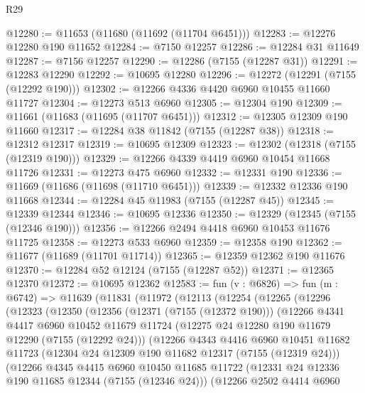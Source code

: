 \begin{lexlean}{R29}
\begin{coremodule}
@12280 := @11653 (@11680 (@11692 (@11704 @6451)))
@12283 := @12276 @12280 @190 @11652
@12284 := @7150 @12257
@12286 := @12284 @31 @11649
@12287 := @7156 @12257
@12290 := @12286 (@7155 (@12287 @31))
@12291 := @12283 @12290
@12292 := @10695 @12280
@12296 := @12272 (@12291 (@7155 (@12292 @190)))
@12302 := @12266 @4336 @4420 @6960 @10455 @11660 @11727
@12304 := @12273 @513 @6960
@12305 := @12304 @190
@12309 := @11661 (@11683 (@11695 (@11707 @6451)))
@12312 := @12305 @12309 @190 @11660
@12317 := @12284 @38 @11842 (@7155 (@12287 @38))
@12318 := @12312 @12317
@12319 := @10695 @12309
@12323 := @12302 (@12318 (@7155 (@12319 @190)))
@12329 := @12266 @4339 @4419 @6960 @10454 @11668 @11726
@12331 := @12273 @475 @6960
@12332 := @12331 @190
@12336 := @11669 (@11686 (@11698 (@11710 @6451)))
@12339 := @12332 @12336 @190 @11668
@12344 := @12284 @45 @11983 (@7155 (@12287 @45))
@12345 := @12339 @12344
@12346 := @10695 @12336
@12350 := @12329 (@12345 (@7155 (@12346 @190)))
@12356 := @12266 @2494 @4418 @6960 @10453 @11676 @11725
@12358 := @12273 @533 @6960
@12359 := @12358 @190
@12362 := @11677 (@11689 (@11701 @11714))
@12365 := @12359 @12362 @190 @11676
@12370 := @12284 @52 @12124 (@7155 (@12287 @52))
@12371 := @12365 @12370
@12372 := @10695 @12362
@12583 := fun (v : @6826) =>
  fun (m : @6742) =>
  @11639
    (@11831
      (@11972
        (@12113
          (@12254
            (@12265
              (@12296
                (@12323
                  (@12350
                    (@12356
                      (@12371 (@7155 (@12372 @190)))
                      (@12266
                        @4341
                        @4417
                        @6960
                        @10452
                        @11679
                        @11724
                        (@12275 @24 @12280 @190 @11679 @12290 (@7155 (@12292 @24)))
                        (@12266
                          @4343
                          @4416
                          @6960
                          @10451
                          @11682
                          @11723
                          (@12304 @24 @12309 @190 @11682 @12317 (@7155 (@12319 @24)))
                          (@12266
                            @4345
                            @4415
                            @6960
                            @10450
                            @11685
                            @11722
                            (@12331 @24 @12336 @190 @11685 @12344 (@7155 (@12346 @24)))
                            (@12266
                              @2502
                              @4414
                              @6960

\end{coremodule}
\end{lexlean}
